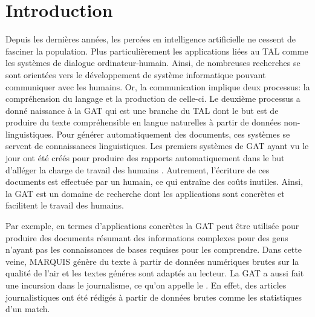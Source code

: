 
\chapter*{Introduction}


Depuis les dernières années, les percées en intelligence artificielle ne cessent de fasciner la population. Plus particulièrement les applications liées au \ac{TAL} comme les systèmes de dialogue ordinateur-humain. Ainsi, de nombreuses recherches se sont orientées vers le développement de système informatique pouvant communiquer avec les humains. Or, la communication implique deux processus: la compréhension du langage et la production de celle-ci. Le deuxième processus a donné naissance à la \ac{GAT} qui est une branche du \ac{TAL} dont le but est de produire du texte compréhensible en langue naturelles à partir de données non-linguistiques. Pour générer automatiquement des documents, ces systèmes se servent de connaissances linguistiques. Les premiers systèmes de \ac{GAT} ayant vu le jour ont été créés pour produire des rapports automatiquement dans le but d'alléger la charge de travail des humains \citep{ReiterBuildingNaturalLanguage2000}. Autrement, l'écriture de ces documents est effectuée par un humain, ce qui entraîne des coûts inutiles. Ainsi, la \ac{GAT} est un domaine de recherche dont les applications sont concrètes et facilitent le travail des humains.

Par exemple, en termes d'applications concrètes la \ac{GAT} peut être utilisée pour produire des documents résumant des informations complexes pour des gens n'ayant pas les connaissances de bases requises pour les comprendre. Dans cette veine, MARQUIS \citep{WannerMARQUISGENERATIONUSERTAILORED2010} génère du texte à partir de données numériques brutes sur la qualité de l'air et les textes généres sont adaptés au lecteur. La \ac{GAT} a aussi fait une incursion dans le journalisme, ce qu'on appelle le  \citep{W17-3513}. En effet, des articles journalistiques ont été rédigés à partir de données brutes comme les statistiques d'un match.

